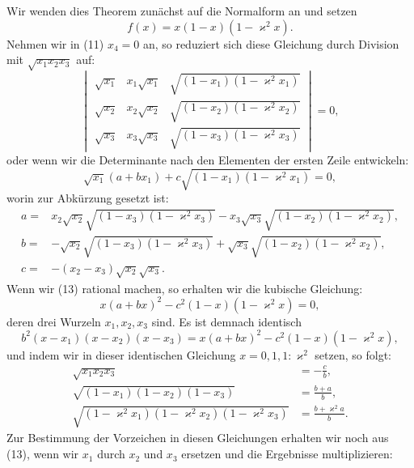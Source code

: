 \documentclass[11pt]{article}
\begin{document}
Wir wenden dies Theorem zunächst auf die Normalform an und setzen
\[
f(x)=x(1-x)(1-\varkappa^2x).
\]
Nehmen wir in (11) $x_4=0$ an, so reduziert sich diese Gleichung durch Division mit $\sqrt{x_1x_2x_3}$ auf:
\begin{equation}
\begin{vmatrix}
\sqrt{x_1}&x_1\sqrt{x_1}&\sqrt{(1-x_1)(1-\varkappa^2x_1)}\\
\sqrt{x_2}&x_2\sqrt{x_2}&\sqrt{(1-x_2)(1-\varkappa^2x_2)}\\
\sqrt{x_3}&x_3\sqrt{x_3}&\sqrt{(1-x_3)(1-\varkappa^2x_3)}
\end{vmatrix}=0,
\tag{12}
\end{equation}
oder wenn wir die Determinante nach den Elementen der ersten Zeile entwickeln:
\begin{equation}
\sqrt{x_1}(a+bx_1)+c\sqrt{(1-x_1)(1-\varkappa^2x_1)}=0,
\tag{13}
\end{equation}
worin zur Abkürzung gesetzt ist:
\begin{equation}
\begin{aligned}
a={}&x_2\sqrt{x_2}\sqrt{(1-x_3)(1-\varkappa^2x_3)}
-x_3\sqrt{x_3}\sqrt{(1-x_2)(1-\varkappa^2x_2)},\\
b={}&-\sqrt{x_2}\sqrt{(1-x_3)(1-\varkappa^2x_3)}
+\sqrt{x_3}\sqrt{(1-x_2)(1-\varkappa^2x_2)},\\
c={}&-(x_2-x_3)\sqrt{x_2}\sqrt{x_3}.
\end{aligned}
\tag{14}
\end{equation}
Wenn wir (13) rational machen, so erhalten wir die kubische Gleichung:
\[
x(a+bx)^2-c^2(1-x)(1-\varkappa^2x)=0,
\]
deren drei Wurzeln $x_1,x_2,x_3$ sind. Es ist demnach identisch
\begin{equation}
b^2(x-x_1)(x-x_2)(x-x_3)
=
x(a+bx)^2-c^2(1-x)(1-\varkappa^2x),
\tag{15}
\end{equation}
und indem wir in dieser identischen Gleichung $x=0,1,1:\varkappa^2$ setzen, so folgt:
\begin{equation}
\begin{aligned}
\sqrt{x_1x_2x_3}&=-\frac cb,\\
\sqrt{(1-x_1)(1-x_2)(1-x_3)}&=\frac{b+a}{b},\\
\sqrt{(1-\varkappa^2x_1)(1-\varkappa^2x_2)(1-\varkappa^2x_3)}&=\frac{b+\varkappa^2a}{b}.
\end{aligned}
\tag{16}
\end{equation}
Zur Bestimmung der Vorzeichen in diesen Gleichungen erhalten wir noch aus (13), wenn wir $x_1$ durch $x_2$ und $x_3$ ersetzen und die Ergebnisse multiplizieren:
\end{document}
